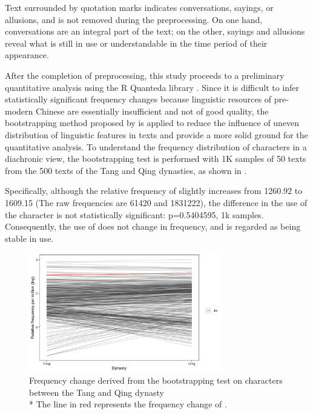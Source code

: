Text surrounded by quotation marks indicates conversations, sayings, or allusions, and is not removed during the preprocessing. On one hand, conversations are an integral part of the text; on the other, sayings and allusions reveal what is still in use or understandable in the time period of their appearance.

After the completion of preprocessing, this study proceeds to a preliminary quantitative analysis using the R Quanteda library \parencite{quanteda}. Since it is difficult to infer statistically significant frequency changes because linguistic resources of pre-modern Chinese are essentially insufficient and not of good quality, the bootstrapping method proposed by \textcite{lijffijt2016bootstrap} is applied to reduce the influence of uneven distribution of linguistic features in texts and provide a more solid ground for the quantitative analysis. To understand the frequency distribution of characters in a diachronic view, the bootstrapping test is performed with 1K samples of 50 texts from the 500 texts of the Tang and Qing dynasties, as shown in . 

Specifically, although the relative frequency of \jia slightly increases from \num{1260.92} to \num{1609.15} (The raw frequencies are \num{61420} and \num{1831222}), the difference in the use of the character is not statistically significant: p=0.5404595, 1k samples. Consequently, the use of \jia does not change in frequency, and is regarded as being stable in use.

\begin{figure}[H]
\centering
\includegraphics[width=0.75\textwidth,keepaspectratio]{figures/Tang_Qing}
\caption{Frequency change derived from the bootstrapping test on characters between the Tang and Qing dynasty\\\footnotesize{* The line in red represents the frequency change of \jia\rspace.}}
\label{fig:freq_boot}
\end{figure}

